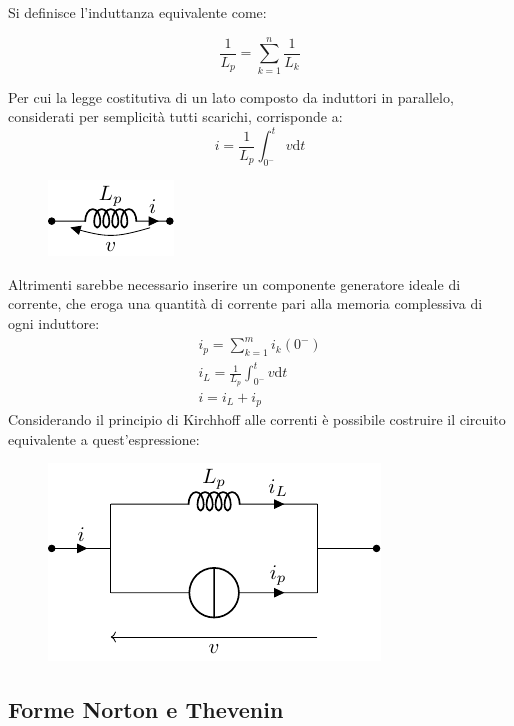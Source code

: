 \documentclass{article}
\newcommand{\df}{\mathrm{d}}
\numberwithin{equation}{subsection}
\begin{document}
Si definisce l'induttanza equivalente come:

\begin{equation*}
    \displaystyle\frac{1}{L_p}=\sum_{k=1}^n\frac{1}{L_k}
\end{equation*}

Per cui la legge costitutiva di un lato composto da induttori in parallelo, considerati per semplicità tutti scarichi, corrisponde a:
\begin{equation}
    i=\displaystyle\frac{1}{L_p}\int_{0^-}^t v\df t
\end{equation}

\begin{figure}[H]%
    \centering
    \includegraphics{induttore-parallelo-equivalente.pdf}
    \label{fig:induttore-parallelo-equivalente}
\end{figure}

Altrimenti sarebbe necessario inserire un componente generatore ideale di corrente, che eroga una quantità di corrente pari alla memoria complessiva di ogni induttore:
\begin{gather*}
    i_p=\displaystyle\sum_{k=1}^mi_k(0^-)\\
    i_L=\displaystyle\frac{1}{L_p}\int_{0^-}^t v\df t\\
    i=i_L+i_p
\end{gather*}
Considerando il principio di Kirchhoff alle correnti è possibile costruire il circuito equivalente a quest'espressione:
\begin{figure}[H]%
    \centering
    \includegraphics{induttore-parallelo-memoria-equivalente.pdf}%
    \label{fig:induttore-parallelo-memoria-equivalente}
\end{figure}

\subsection{Forme Norton e Thevenin}
\end{document}
